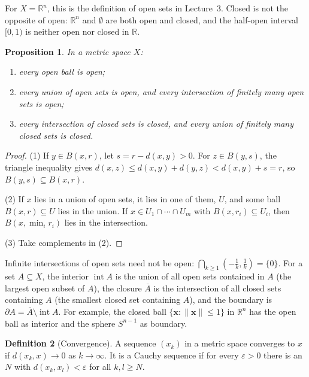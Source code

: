 \documentclass[11pt]{article}
\newcommand{\norm}[1]{\lVert #1 \rVert}
\theoremstyle{definition}
\newtheorem{definition}{Definition}[section]
\theoremstyle{plain}
\newtheorem{proposition}[definition]{Proposition}
\theoremstyle{remark}
\DeclareMathOperator{\interior}{int}
\begin{document}
For $X = \mathbb{R}^n$, this is the definition of open sets in Lecture~3. Closed is not the opposite of open: $\mathbb{R}^n$ and $\emptyset$ are both open and closed, and the half-open interval $[0, 1)$ is neither open nor closed in $\mathbb{R}$.

\begin{proposition}\label{prop:open-sets}
    In a metric space $X$:
    \begin{enumerate}
        \item every open ball is open;
        \item every union of open sets is open, and every intersection of finitely many open sets is open;
        \item every intersection of closed sets is closed, and every union of finitely many closed sets is closed.
    \end{enumerate}
\end{proposition}

\begin{proof}
    (1) If $y \in B(x, r)$, let $s = r - d(x, y) > 0$. For $z \in B(y, s)$, the triangle inequality gives $d(x, z) \leq d(x, y) + d(y, z) < d(x, y) + s = r$, so $B(y, s) \subseteq B(x, r)$.

    (2) If $x$ lies in a union of open sets, it lies in one of them, $U$, and some ball $B(x, r) \subseteq U$ lies in the union. If $x \in U_1 \cap \cdots \cap U_m$ with $B(x, r_i) \subseteq U_i$, then $B(x, \min_i r_i)$ lies in the intersection.

    (3) Take complements in (2).
\end{proof}

Infinite intersections of open sets need not be open: $\bigcap_{k \geq 1}(-\frac{1}{k}, \frac{1}{k}) = \{0\}$. For a set $A \subseteq X$, the interior $\interior A$ is the union of all open sets contained in $A$ (the largest open subset of $A$), the closure $\overline{A}$ is the intersection of all closed sets containing $A$ (the smallest closed set containing $A$), and the boundary is $\partial A = \overline{A} \setminus \interior A$. For example, the closed ball $\{\mathbf{x} : \norm{\mathbf{x}} \leq 1\}$ in $\mathbb{R}^n$ has the open ball as interior and the sphere $S^{n-1}$ as boundary.

\begin{definition}[Convergence]\label{def:convergence}
    A sequence $(x_k)$ in a metric space converges to $x$ if $d(x_k, x) \to 0$ as $k \to \infty$. It is a Cauchy sequence if for every $\varepsilon > 0$ there is an $N$ with $d(x_k, x_l) < \varepsilon$ for all $k, l \geq N$.
\end{definition}
\end{document}
